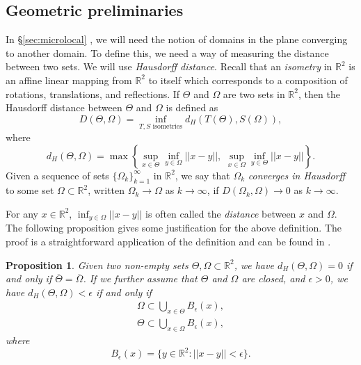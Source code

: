 \documentclass{amsart}
\newtheorem{proposition}[theorem]{Proposition}
\theoremstyle{definition}
\newcommand*{\R}{\mathbb{R}}
\begin{document}
\subsection{Geometric preliminaries}
In \S\ref{sec:microlocal} , we will need the notion of domains in the plane converging to another domain. To define this, we need a way of measuring the distance between two sets. We will use \textit{Hausdorff distance}. %
Recall that an \textit{isometry} in $\R^2$ is an affine linear mapping from $\R^2$ to itself which corresponds to a composition of rotations, translations, and reflections. If $\Theta$ and $\Omega$ are two sets in $\R^2$, then the Hausdorff distance between $\Theta$ and $\Omega$ is defined as
    \begin{equation*}
        D(\Theta, \Omega) = \inf_{T, S \text{ isometries}} d_H(T(\Theta), S(\Omega)),
    \end{equation*}
    where
    \begin{equation*}
        d_H(\Theta, \Omega) = \max\left\{\sup_{x \in \Theta} \inf_{y \in \Omega} ||x-y||, \,\,\sup_{x \in \Omega} \inf_{y \in \Theta} ||x-y|| \right\}.
    \end{equation*}
    Given a sequence of sets $\{\Omega_k\}_{k=1}^\infty$ in $\R^2$, we say that $\Omega_k$ \textit{converges in Hausdorff} to some set $\Omega \subset \R^2$, written $\Omega_k \to \Omega$ as $k \to \infty$, if $D(\Omega_k, \Omega) \to 0$ as $k \to \infty$. 

For any $x \in \R^2$, $\inf_{y \in \Omega}||x-y||$ is often called the \textit{distance} between $x$ and $\Omega$. The following proposition gives some justification for the above definition. The proof is a straightforward application of the definition and can be found in \cite[p. 6-7]{maardby2023mathematics}.
\begin{proposition} \label{prop:Hausdorf_distance_less_than_epsilon}
    Given two non-empty sets $\Theta, \Omega \subset \R^2$, we have $d_H(\Theta, \Omega) = 0$ if and only if $\overline{\Theta} = \overline{\Omega}$.  If we further assume that $\Theta$ and  $\Omega$ are closed, and $\epsilon > 0$, we have $d_H(\Theta, \Omega) < \epsilon$ if and only if
    \begin{equation} \label{eq:union_balls}
        \begin{split}
            \Omega \subset \bigcup_{x \in \Theta} B_{\epsilon}(x), \\
        \Theta \subset \bigcup_{x \in \Omega} B_{\epsilon}(x),
        \end{split}
    \end{equation}
    where
    \begin{equation*}
        B_\epsilon(x) = \{y \in \R^2 : ||x-y|| < \epsilon\}.
    \end{equation*}
\end{proposition}
\end{document}
